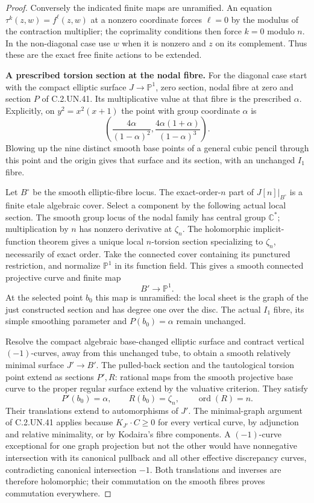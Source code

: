 \begin{proof}
Conversely the indicated finite maps are unramified.
An equation $\tau^k(z,w)=f^\ell(z,w)$ at a nonzero coordinate
forces $\ell=0$ by the modulus of the contraction multiplier;
the coprimality conditions then force $k=0$ modulo $n$.
In the non-diagonal case use $w$ when it is nonzero and
$z$ on its complement. Thus these are the exact free
finite actions to be extended.

\par\medskip\noindent\textbf{A prescribed torsion section at the nodal fibre.}
For the diagonal case start with the compact elliptic surface
$J\to\mathbb P^1$, zero section, nodal fibre at zero and
section $P$ of C.2.UN.41. Its multiplicative value at that
fibre is the prescribed $\alpha$. Explicitly, on
$y^2=x^2(x+1)$ the point with group coordinate $\alpha$ is
\[
 \left(\frac{4\alpha}{(1-\alpha)^2},
       \frac{4\alpha(1+\alpha)}{(1-\alpha)^3}\right).
\tag{C.SH.5}
\]
Blowing up the nine distinct smooth base points of a general
cubic pencil through this point and the origin gives that
surface and its section, with an unchanged $I_1$ fibre.

Let $B^\circ$ be the smooth elliptic-fibre locus.
The exact-order-$n$ part of $J[n]|_{B^\circ}$ is a finite
etale algebraic cover. Select a component by the following
actual local section. The smooth group locus of the nodal
family has central group $\mathbb C^*$; multiplication by
$n$ has nonzero derivative at $\zeta_n$. The holomorphic
implicit-function theorem gives a unique local $n$-torsion
section specializing to $\zeta_n$, necessarily of exact order.
Take the connected cover containing its punctured restriction,
and normalize $\mathbb P^1$ in its function field. This gives
a smooth connected projective curve and finite map
\[
                             B'\longrightarrow\mathbb P^1.
\tag{C.SH.6}
\]
At the selected point $b_0$ this map is unramified: the local
sheet is the graph of the just constructed section and has
degree one over the disc. The actual $I_1$ fibre, its simple
smoothing parameter and $P(b_0)=\alpha$ remain unchanged.

Resolve the compact algebraic base-changed elliptic surface
and contract vertical $(-1)$-curves, away from this unchanged
tube, to obtain a smooth relatively minimal surface $J'\to B'$.
The pulled-back section and the tautological torsion point
extend as sections $P',R$: rational maps from the smooth
projective base curve to the proper regular surface extend by
the valuative criterion. They satisfy
\[
                 P'(b_0)=\alpha,\qquad R(b_0)=\zeta_n,
                 \qquad \operatorname{ord}(R)=n.
\tag{C.SH.7}
\]
Their translations extend to automorphisms of $J'$.
The minimal-graph argument of C.2.UN.41 applies because
$K_{J'}\cdot C\ge0$ for every vertical curve, by adjunction
and relative minimality, or by Kodaira's fibre components.
A $(-1)$-curve exceptional for one graph projection but not
the other would have nonnegative intersection with its
canonical pullback and all other effective discrepancy
curves, contradicting canonical intersection $-1$.
Both translations and inverses are therefore holomorphic;
their commutation on the smooth fibres proves commutation
everywhere.


\end{proof}
